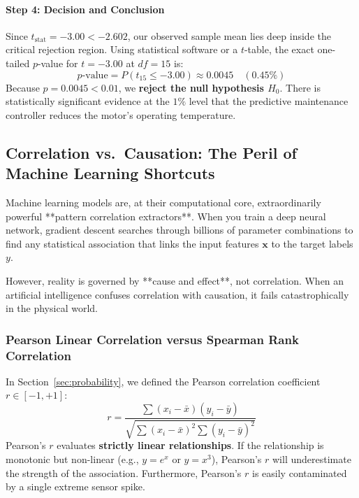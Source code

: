 \begin{example}
\paragraph{Step 4: Decision and Conclusion}
Since $t_{\text{stat}} = -3.00 < -2.602$, our observed sample mean lies deep inside the critical rejection region.
Using statistical software or a $t$-table, the exact one-tailed $p$-value for $t = -3.00$ at $df = 15$ is:
\begin{equation*}
p\text{-value} = P(t_{15} \le -3.00) \approx \mathbf{0.0045} \quad (0.45\%)
\end{equation*}
Because $p = 0.0045 < 0.01$, we \textbf{reject the null hypothesis $H_0$}. There is statistically significant evidence at the $1\%$ level that the predictive maintenance controller reduces the motor's operating temperature.
\end{example}

\subsection{Correlation vs.\ Causation: The Peril of Machine Learning Shortcuts}\label{subsec:stat_correlation_causation}

Machine learning models are, at their computational core, extraordinarily powerful **pattern correlation extractors**. When you train a deep neural network, gradient descent searches through billions of parameter combinations to find any statistical association that links the input features $\mathbf{x}$ to the target labels $y$.

However, reality is governed by **cause and effect**, not correlation. When an artificial intelligence confuses correlation with causation, it fails catastrophically in the physical world.

\subsubsection{Pearson Linear Correlation versus Spearman Rank Correlation}
In Section~\ref{sec:probability}, we defined the Pearson correlation coefficient $r \in [-1, +1]$:
\begin{equation}
r = \frac{\sum (x_i - \bar{x})(y_i - \bar{y})}{\sqrt{\sum (x_i - \bar{x})^2 \sum (y_i - \bar{y})^2}}\label{eq:pearson_r}
\end{equation}
Pearson's $r$ evaluates \textbf{strictly linear relationships}. If the relationship is monotonic but non-linear (e.g., $y = e^{x}$ or $y = x^3$), Pearson's $r$ will underestimate the strength of the association. Furthermore, Pearson's $r$ is easily contaminated by a single extreme sensor spike.

